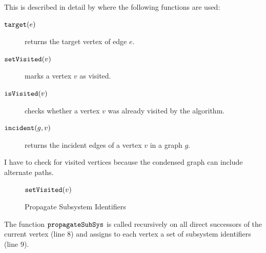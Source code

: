 \begin{description}
        This is described in detail by \Alg{\ref{alg_propagate}} where the following functions are used:
        \begin{description}
            \item[$\textnormal{\tt target}(e)$] returns the target vertex of edge $e$.
            \item[$\textnormal{\tt setVisited}(v)$] marks a vertex $v$ as visited.
            \item[$\textnormal{\tt isVisited}(v)$] checks whether a vertex $v$ was already visited by the algorithm.
            \item[$\textnormal{\tt incident}(g, v)$] returns the incident edges of a vertex $v$ in a graph $g$.
        \end{description}
        I have to check for visited vertices because the condensed graph can include alternate paths.
        \begin{figure}[!t]
            \TopAlgSpace
            \removelatexerror
            \begin{algorithm}[H]
                \caption{Propagate Subsystem Identifiers}
                \label{alg_propagate}
                \begin{algorithmic}[1]
                    \Statex
                    \State {}
                    \EndIf
                    \State $\textnormal{\tt setVisited}(v)$
                    \EndFor
                    \State {}
                    \EndFunction
                \end{algorithmic}
            \end{algorithm}
            \BotAlgSpace
        \end{figure}
        The function $\textnormal{\tt propagateSubSys}$ is called recursively on all direct successors of the current vertex (line 8) and assigns to each vertex a set of subsystem identifiers (line 9).

\end{description}
